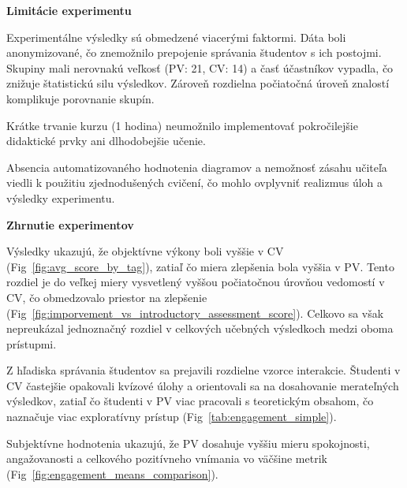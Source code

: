 



\textbf{Limitácie experimentu}

Experimentálne výsledky sú obmedzené viacerými faktormi. Dáta boli anonymizované, čo znemožnilo prepojenie správania študentov s ich postojmi. Skupiny mali nerovnakú veľkosť (PV: 21, CV: 14) a časť účastníkov vypadla, čo znižuje štatistickú silu výsledkov. Zároveň rozdielna počiatočná úroveň znalostí komplikuje porovnanie skupín.

Krátke trvanie kurzu (1 hodina) neumožnilo implementovať pokročilejšie didaktické prvky ani dlhodobejšie učenie. 

Absencia automatizovaného hodnotenia diagramov a nemožnosť zásahu učiteľa viedli k použitiu zjednodušených cvičení, čo mohlo ovplyvniť realizmus úloh a výsledky experimentu.

\textbf{Zhrnutie experimentov}

Výsledky ukazujú, že objektívne výkony boli vyššie v CV (Fig~\ref{fig:avg_score_by_tag}), zatiaľ čo miera zlepšenia bola vyššia v PV. Tento rozdiel je do veľkej miery vysvetlený vyššou počiatočnou úrovňou vedomostí v CV, čo obmedzovalo priestor na zlepšenie (Fig~\ref{fig:imporvement_vs_introductory_assessment_score}). Celkovo sa však nepreukázal jednoznačný rozdiel v celkových učebných výsledkoch medzi oboma prístupmi.

Z hľadiska správania študentov sa prejavili rozdielne vzorce interakcie. Študenti v CV častejšie opakovali kvízové úlohy a orientovali sa na dosahovanie merateľných výsledkov, zatiaľ čo študenti v PV viac pracovali s teoretickým obsahom, čo naznačuje viac exploratívny prístup (Fig~\ref{tab:engagement_simple}).

Subjektívne hodnotenia ukazujú, že PV dosahuje vyššiu mieru spokojnosti, angažovanosti a celkového pozitívneho vnímania vo väčšine metrik (Fig~\ref{fig:engagement_means_comparison}).

